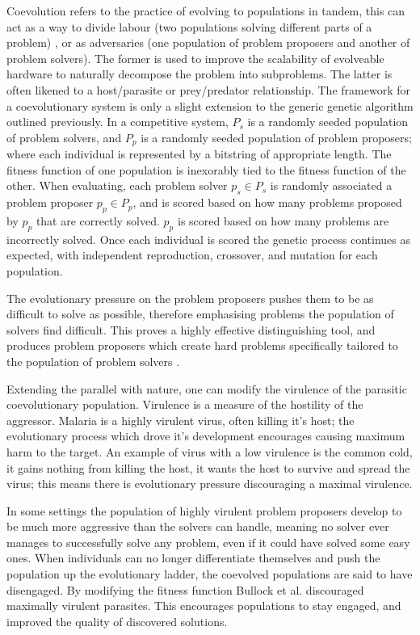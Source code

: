Coevolution refers to the practice of evolving to populations in tandem, this can
act as a way to divide labour (two populations solving different parts of a problem)
 \cite{Potter:2000:CCA:1108888.1108890},
or as adversaries (one population of problem proposers and another of problem solvers).
The former is used to improve the scalability of evolveable hardware to naturally
decompose the problem into subproblems.
The latter is often likened to a host/parasite or prey/predator relationship.
The framework for a coevolutionary system is only a slight extension to the
generic genetic algorithm outlined previously. In a competitive system, $P_s$ is a randomly
seeded population of problem solvers, and $P_p$ is a randomly seeded population
of problem proposers; where each individual is represented by a bitstring of
appropriate length. The fitness function of one population is inexorably tied to
the fitness function of the other.
When evaluating, each problem solver $p_s \in P_s$ is randomly associated
a problem proposer $p_p \in P_p$, and is scored based on how many problems proposed by
$p_p$ that are correctly solved. $p_p$ is scored based on how many problems
are incorrectly solved. Once each individual is scored the genetic process continues as expected,
with independent reproduction, crossover, and mutation for each population.

The evolutionary pressure on the problem proposers pushes them to be as difficult
to solve as possible, therefore emphasising problems the population of solvers
find difficult. This proves a highly effective distinguishing tool, and produces
problem proposers which create hard problems specifically tailored to the population
of problem solvers \cite{HILLIS1990228}.

Extending the parallel with nature, one can modify the virulence of the parasitic
coevolutionary population. Virulence is a measure of the hostility of the aggressor.
Malaria is a highly virulent virus, often killing it's host; the evolutionary
process which drove it's development encourages causing maximum harm to the target.
An example of virus with a low virulence is the common cold, it gains nothing from
killing the host, it wants the host to survive and spread the virus; this means
there is evolutionary pressure discouraging a maximal virulence.

In some settings the population of highly virulent problem proposers develop to be much more
aggressive than the solvers can handle, meaning no solver ever manages to
successfully solve any problem, even if it could have solved some easy ones.
When individuals can no longer
differentiate themselves and push the population up the evolutionary ladder,
the coevolved populations are said to have disengaged.
By modifying the fitness function Bullock et al. \cite{6790490}
discouraged maximally
virulent parasites. This encourages populations to stay engaged, and improved the
quality of discovered solutions.

